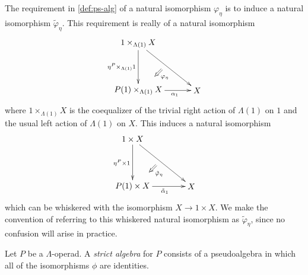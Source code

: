 \begin{rem}
  The requirement in \cref{def:ps-alg} of a natural isomorphism $\varphi_\eta$ is to induce a natural isomorphism $\tilde{\varphi}_\eta$. This requirement is really of a natural isomorphism
    \[
      \xy
        (0,0)*+{1 \times_{\Lambda(1)} X}="a";
        (0,-20)*+{P(1) \times_{\Lambda(1)} X}="b";
        (25,-20)*+{X}="c";
        {\ar_{\eta^P \times_{\Lambda(1)} 1} "a" ; "b"};
        {\ar_<<<<<{\alpha_1} "b" ; "c"};
        {\ar "a" ; "c"};
        {\ar@{=>}^{\varphi_\eta} (10,-11) ; (7,-14)};
      \endxy
    \]
  where $1 \times_{\Lambda(1)} X$ is the coequalizer of the trivial right action of $\Lambda(1)$ on $1$ and the usual left action of $\Lambda(1)$ on $X$. This induces a natural isomorphism
    \[
      \xy
        (0,0)*+{1 \times X}="a";
        (0,-20)*+{P(1) \times X}="b";
        (25,-20)*+{X}="c";
        {\ar_{\eta^P \times 1} "a" ; "b"};
        {\ar_<<<<<<{\tilde{\alpha}_1} "b" ; "c"};
        {\ar "a" ; "c"};
        {\ar@{=>}^{\tilde{\varphi}_\eta} (10,-11) ; (7,-14)};
      \endxy
    \]
  which can be whiskered with the isomorphism $X \rightarrow 1 \times X$. We make the convention of referring to this whiskered natural isomorphism as $\tilde{\varphi}_\eta$, since no confusion will arise in practice.
\end{rem}

\begin{Defi}
Let $P$ be a $\Lambda$-operad. A \textit{strict algebra} for $P$ consists of a pseudoalgebra in which all of the isomorphisms $\phi$ are identities.
\end{Defi}

